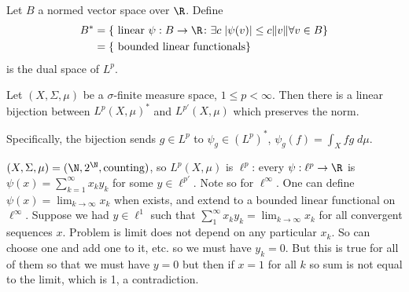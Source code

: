

\begin{dfn}
Let $B$ a normed vector space over $\R$. Define
	\[
	\begin{split}
	B^*&= \{ \text{ linear } \psi: B \to \R \colon \exists c \; |\psi(v)| \leq c \|v\| \forall v \in B \} \\
	&= \{ \text{ bounded linear functionals} \}
	\end{split}
	\]
is the dual space of $L^p$.
\end{dfn}


\begin{thm}
Let $(X,\Sigma,\mu)$ be a $\sigma$-finite measure space, $1 \leq p < \infty$. Then there is a linear bijection between $L^p(X,\mu)^*$ and $L^{p'}(X,\mu)$ which preserves the norm. 
\end{thm}

Specifically, the bijection sends $g \in L^p$ to $\psi_g \in (L^p)^*$, $\psi_g(f)= \int_X fg \; d\mu$. 


\begin{ex}
$(X,\Sigma,\mu) = (\N, 2^\N, \text{counting})$, so $L^p(X,\mu)$ is $\ell^p$: every $\psi: \ell^p \to \R$ is $\psi(x)= \sum_{k=1}^\infty x_k y_k$ for some $y \in \ell^{p'}$. Note so for $\ell^\infty$. One can define $\psi(x)= \lim_{k \to \infty} x_k$ when exists, and extend to a bounded linear functional on $\ell^\infty$. Suppose we had $y \in \ell^1$ such that $\sum_1^\infty x_ky_k = \lim_{k \to \infty} x_k$ for all convergent sequences $x$. Problem is limit does not depend on any particular $x_k$. So can choose one and add one to it, etc. so we must have $y_k=0$. But this is true for all of them so that we must have $y=0$ but then if $x=1$ for all $k$ so sum is not equal to the limit, which is 1, a contradiction. 
\end{ex}


